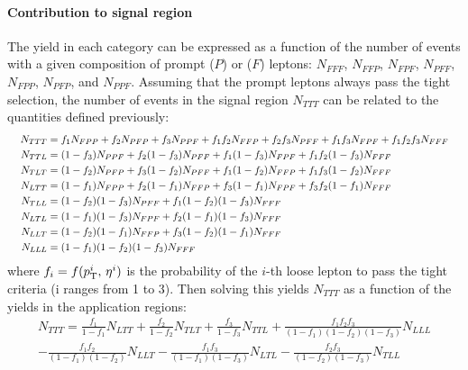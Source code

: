 \paragraph{Contribution to signal region\\}
The yield in each category can be expressed as a function of the number of events
with a given composition of prompt ($P$) or \nonprompt ($F$) leptons:
$N_{FFF}$, $N_{FFP}$, $N_{FPF}$, $N_{PFF}$, $N_{FPP}$, $N_{PFP}$, and $N_{PPF}$.
Assuming that the prompt leptons always pass the tight selection,
the number of \nonprompt events in the signal region $N_{TTT}$ can be related to the quantities defined previously:
\begin{equation}
  \resizebox{\textwidth}{!}{
    $\begin{aligned}
      N_{TTT} &= f_1 N_{FPP} + f_2 N_{PFP}+f_3 N_{PPF}+f_1 f_2 N_{FFP}+f_2 f_3 N_{PFF}+f_1 f_3 N_{FPF}+f_1 f_2 f_3 N_{FFF}\\
      N_{TTL} &= (1-f_3) N_{PPF} + f_2(1-f_3) N_{PFF} + f_1(1-f_3) N_{FPF} + f_1 f_2(1-f_3) N_{FFF}\\
      N_{TLT} &= (1-f_2) N_{PFP} + f_3(1-f_2) N_{PFF} + f_1(1-f_2) N_{FFP} + f_1 f_3(1-f_2) N_{FFF}\\
      N_{LTT} &= (1-f_1) N_{FPP} + f_2(1-f_1) N_{FFP} + f_3(1-f_1) N_{FPF} + f_3 f_2(1-f_1) N_{FFF}\\
      N_{TLL} &= (1-f_2)(1-f_3) N_{PFF} + f_1(1-f_2)(1-f_3) N_{FFF}\\
      N_{LTL} &= (1-f_1)(1-f_3) N_{FPF} + f_2(1-f_1)(1-f_3) N_{FFF}\\
      N_{LLT} &= (1-f_2)(1-f_1) N_{FFP} + f_3(1-f_2)(1-f_1) N_{FFF}\\
      N_{LLL} &= (1-f_1)(1-f_2)(1-f_3) N_{FFF}
    \end{aligned}$
  }
\end{equation}
where $f_i = f(p_{\mathrm{T}}^{i},\, \eta^{i})$ is the probability of the $i$-th loose \nonprompt lepton to pass the tight criteria (i ranges from 1 to 3).
Then solving this yields $N_{TTT}$ as a function of the yields in the application regions:
\begin{equation}
\begin{split}
N_{TTT} =
  \frac{f_1}{1-f_1} N_{LTT}
+ \frac{f_2}{1-f_2} N_{TLT}
+ \frac{f_3}{1-f_3} N_{TTL}
+ \frac{f_1 f_2 f_3}{(1-f_1)(1-f_2)(1-f_3)} N_{LLL}\\
- \frac{f_1 f_2}{(1-f_1)(1-f_2)} N_{LLT}
- \frac{f_1 f_3}{(1-f_1)(1-f_3)} N_{LTL}
- \frac{f_2 f_3}{(1-f_2)(1-f_3)} N_{TLL}
\end{split}
\end{equation}
